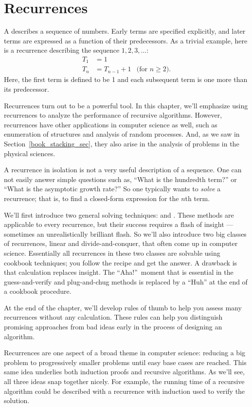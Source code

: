 \part{Recurrences}\label{part:recurrences}

\partintro

A  describes a sequence of numbers.  Early terms are
specified explicitly, and later terms are expressed as a function of
their predecessors.  As a trivial example, here is a recurrence describing
the sequence $1, 2, 3,\dots$:
\begin{align*}
T_1 & = 1 \\
T_n & = T_{n-1} + 1 & \text{(for $n \geq 2$)}.
\end{align*}
Here, the first term is defined to be 1 and each subsequent term is
one more than its predecessor.

Recurrences turn out to be a powerful tool.  In this chapter, we'll
emphasize using recurrences to analyze the performance of recursive
algorithms.  However, recurrences have other applications in computer
science as well, such as enumeration of structures and analysis of
random processes.  And, as we saw in Section~\ref{book_stacking_sec},
they also arise in the analysis of problems in the physical sciences.

A recurrence in isolation is not a very useful description of a
sequence.  One can not easily answer simple questions such as, ``What
is the hundredth term?'' or ``What is the asymptotic growth rate?''
So one typically wants to \emph{solve} a recurrence; that is, to find a
closed-form expression for the $n$th term.

We'll first introduce two general solving techniques:
 and .  These methods are
applicable to every recurrence, but their success requires a flash of
insight ---sometimes an unrealistically brilliant flash.  So we'll
also introduce two big classes of recurrences, linear and
divide-and-conquer, that often come up in computer science.
Essentially all recurrences in these two classes are solvable using
cookbook techniques; you follow the recipe and get the answer.  A
drawback is that calculation replaces insight.  The ``Aha!''\ moment
that is essential in the guess-and-verify and plug-and-chug methods is
replaced by a ``Huh'' at the end of a cookbook procedure.

At the end of the chapter, we'll develop rules of thumb to help you
assess many recurrences without any calculation.  These rules can help
you distinguish promising approaches from bad ideas early in the
process of designing an algorithm.

Recurrences are one aspect of a broad theme in computer science:
reducing a big problem to progressively smaller problems until easy
base cases are reached.  This same idea underlies both induction
proofs and recursive algorithms.  As we'll see, all three ideas snap
together nicely.  For example, the running time of a recursive
algorithm could be described with a recurrence with induction used to
verify the solution.

\endinput
